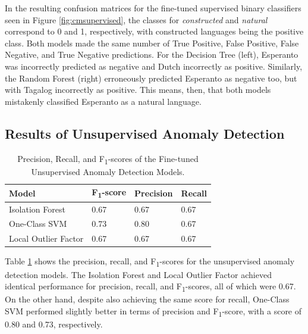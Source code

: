 \documentclass[12pt,a4paper]{article}
\numberwithin{figure}{section}
\numberwithin{table}{section}
\numberwithin{definition}{section}
\begin{document}
In the resulting confusion matrices for the fine-tuned supervised binary classifiers seen in Figure \ref{fig:cmsupervised}, the classes for \textit{constructed} and \textit{natural} correspond to 0 and 1, respectively, with constructed languages being the positive class. Both models made the same number of True Positive, False Positive, False Negative, and True Negative predictions. For the Decision Tree (left), Esperanto was incorrectly predicted as negative and Dutch incorrectly as positive. Similarly, the Random Forest (right) erroneously predicted Esperanto as negative too, but with Tagalog incorrectly as positive. This means, then, that both models mistakenly classified Esperanto as a natural language. 

\subsection{Results of Unsupervised Anomaly Detection}
\label{ssec:anomalydetectionresults}

\begin{table}[!h]
  \centering
  \caption{Precision, Recall, and F\textsubscript{1}-scores of the Fine-tuned Unsupervised Anomaly Detection Models.}
  \renewcommand{\arraystretch}{1.0}
  \begin{tabular}{|l|l|l|l|}
  \hline
    \textbf{Model} & \textbf{F\textsubscript{1}-score} & \textbf{Precision} & \textbf{Recall} \\ \hline
      Isolation Forest & 0.67 & 0.67 & 0.67 \\ 
      One-Class SVM & 0.73 & 0.80 & 0.67 \\
      Local Outlier Factor & 0.67 & 0.67 & 0.67 \\ \hline
  \end{tabular}
  \label{tbl:unsupervisedevaluation}
\end{table}

Table \ref{tbl:unsupervisedevaluation} shows the precision, recall, and F\textsubscript{1}-scores for the unsupervised anomaly detection models. The Isolation Forest and Local Outlier Factor achieved identical performance for precision, recall, and F\textsubscript{1}-scores, all of which were 0.67. On the other hand, despite also achieving the same score for recall, One-Class SVM performed slightly better in terms of precision and F\textsubscript{1}-score, with a score of 0.80 and 0.73, respectively.
\end{document}
